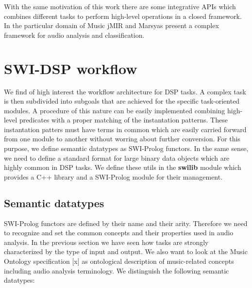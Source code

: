 \documentclass{llncs}
\begin{document}
With the same motivation of this work there are some integrative APIs which combines different tasks to perform high-level operations in a closed framework. In the particular domain of Music jMIR and Marsyas present a complex framework for audio analysis and classification.

\section{SWI-DSP workflow}

We find of high interest the workflow architecture for DSP tasks. A complex task is then subdivided into subgoals that are achieved for the specific task-oriented modules. A procedure of this nature can be easily implemented combining high-level predicates with a proper matching of the instantation patterns. These instantation patters must have terms in common which are easily carried forward from one module to another without worring about further conversion. For this purpose, we define semantic datatypes as SWI-Prolog functors. In the same sense, we need to define a standard format for large binary data objects which are highly common in DSP tasks. We define these utils in the \textbf{swilib} module which provides a C++ library and a SWI-Prolog module for their management.

\subsection{Semantic datatypes}

SWI-Prolog functors are defined by their name and their arity. Therefore we need to recognize and set the common concepts and their properties used in audio analysis. In the previous section we have seen how tasks are strongly characterized by the type of input and output. We also want to look at the Music Ontology specification [x] as ontological description of music-related concepts including audio analysis terminology. We distinguish the following semantic datatypes:
\end{document}
